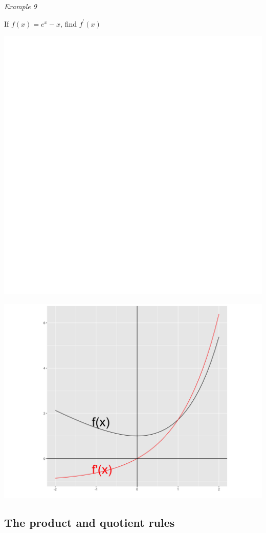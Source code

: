 \documentclass[]{book}
\begin{document}
\emph{Example 9}

If \(f(x)=e^x-x\), find \(f^\prime(x)\)

\begin{center}\includegraphics[width=1\linewidth]{figure/LB15-1} \end{center}

\begin{center}\includegraphics[width=0.8\linewidth]{figure/LB16-1} \end{center}

\hypertarget{the-product-and-quotient-rules}{%
\subsection{The product and quotient rules}\label{the-product-and-quotient-rules}}
\end{document}
